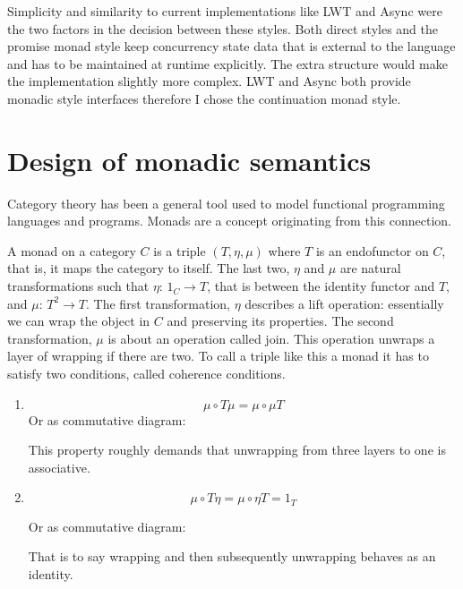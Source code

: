\documentclass[12pt,twoside,notitlepage]{report}
\begin{document}
Simplicity and similarity to current implementations like LWT and Async were the two factors in the decision between these styles. Both direct styles and the promise monad style keep concurrency state data that is external to the language and has to be maintained at runtime explicitly. The extra structure would make the implementation slightly more complex. LWT and Async both provide monadic style interfaces therefore I chose the continuation monad style.





\section{Design of monadic semantics}
Category theory has been a general tool used to model functional programming languages and programs. Monads are a concept originating from this connection. 


A monad on a category $ C $ is a triple $ (T, \eta, \mu) $ where $ T $ is an endofunctor on $ C $, that is, it maps the category to itself. The last two, $ \eta $ and $ \mu $ are natural transformations such that $ \eta:\, 1_C \rightarrow T $, that is between the identity functor and $ T $, and $ \mu:\, T^2 \rightarrow T $. The first transformation, $ \eta $ describes a lift operation: essentially we can wrap the object in $ C $ and preserving its properties. The second transformation, $ \mu $ is about an operation called join. This operation unwraps a layer of wrapping if there are two. To call a triple like this a monad it has to satisfy two conditions, called coherence conditions.
\begin{enumerate}

\item{
\[ \mu \circ T \mu = \mu \circ \mu T \]
Or as commutative diagram:
\begin{center}
\end{center}
This property roughly demands that unwrapping from three layers to one is associative.



}
\item{
\[ \mu \circ T\eta = \mu \circ \eta T = 1_T \]

Or as commutative diagram:
\begin{center}
\end{center}

That is to say wrapping and then subsequently unwrapping behaves as an identity.
}
\end{enumerate}
\end{document}
